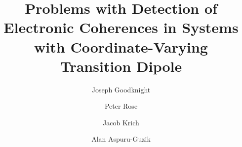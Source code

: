 



\title{Problems with Detection of Electronic Coherences in Systems with Coordinate-Varying Transition Dipole}
\author{Joseph Goodknight}
\author{Peter Rose}
\author{Jacob Krich }
\author{Alan Aspuru-Guzik}
\begin{abstract}
  
\end{abstract}

\maketitle








